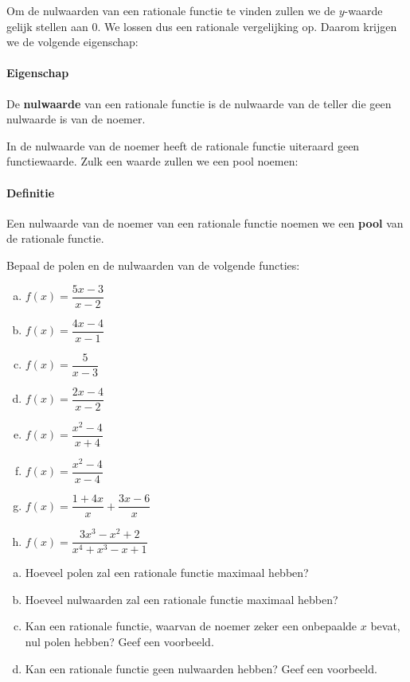\documentclass[12pt]{article}
\begin{document}
Om de nulwaarden van een rationale functie te vinden zullen we de $y$-waarde gelijk stellen aan $0$. We lossen dus een rationale vergelijking op. Daarom krijgen we de volgende eigenschap:

\paragraph*{Eigenschap}
\begin{mdframed}
De {\bf nulwaarde} van een rationale functie is de nulwaarde van de teller die geen nulwaarde is van de noemer.
\end{mdframed}

In de nulwaarde van de noemer heeft de rationale functie uiteraard geen functiewaarde. Zulk een waarde zullen we een pool noemen:

\paragraph*{Definitie}
\begin{mdframed}
Een nulwaarde van de noemer van een rationale functie noemen we een {\bf pool} van de rationale functie.
\end{mdframed}

\begin{oefening}
Bepaal de polen en de nulwaarden van de volgende functies:
\begin{multicols}{2}
\begin{enumerate}[(a)]
  \itemsep1em
  \item $f(x)=\dfrac{5x-3}{x-2}$
  \item $f(x)=\dfrac{4x-4}{x-1}$
  \item $f(x)=\dfrac{5}{x-3}$
  \item $f(x)=\dfrac{2x-4}{x-2}$
  \item $f(x)=\dfrac{x^2-4}{x+4}$
  \item $f(x)=\dfrac{x^2-4}{x-4}$
  \item $f(x)=\dfrac{1+4x}{x}+\dfrac{3x-6}{x}$
  \item $f(x)=\dfrac{3x^3-x^2+2}{x^4+x^3-x+1}$
\end{enumerate}
\end{multicols}\end{oefening}

\begin{oefening}
\begin{enumerate}[(a)]
  \item Hoeveel polen zal een rationale functie maximaal hebben?
  \item Hoeveel nulwaarden zal een rationale functie maximaal hebben?
  \item Kan een rationale functie, waarvan de noemer zeker een onbepaalde $x$ bevat, nul polen hebben? Geef een voorbeeld.
  \item Kan een rationale functie geen nulwaarden hebben? Geef een voorbeeld.
\end{enumerate}
\end{oefening}
\end{document}
